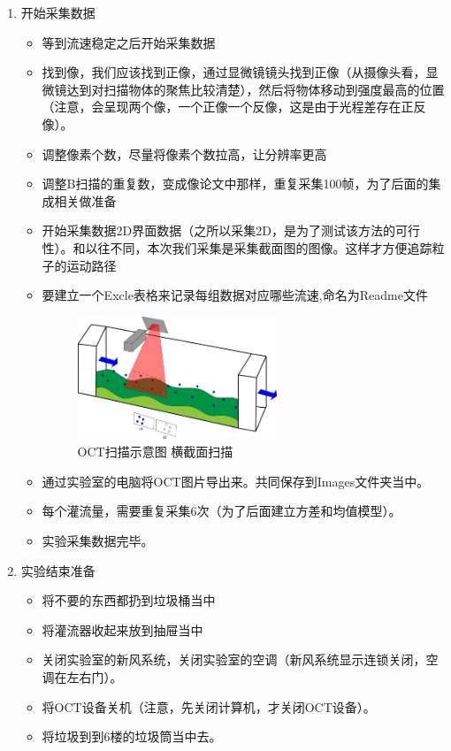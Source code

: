 \documentclass[12pt]{article}
\begin{document}
\begin{enumerate}
    \item 开始采集数据
    \begin{itemize}
        \item 等到流速稳定之后开始采集数据
        \item 找到像，我们应该找到正像，通过显微镜镜头找到正像（从摄像头看，显微镜达到对扫描物体的聚焦比较清楚），然后将物体移动到强度最高的位置（注意，会呈现两个像，一个正像一个反像，这是由于光程差存在正反像）。
        \item 调整像素个数，尽量将像素个数拉高，让分辨率更高
        \item 调整B扫描的重复数，变成像论文中那样，重复采集100帧，为了后面的集成相关做准备
        \item 开始采集数据2D界面数据（之所以采集2D，是为了测试该方法的可行性）。和以往不同，本次我们采集是采集截面图的图像。这样才方便追踪粒子的运动路径
        \item 要建立一个Excle表格来记录每组数据对应哪些流速,命名为Readme文件

        \begin{figure}[H]
            \centering
            \includegraphics[width=0.6\textwidth]{Images/OCT扫描示意图.png}
            \caption{OCT扫描示意图 横截面扫描}

        \end{figure}
        \item 通过实验室的电脑将OCT图片导出来。共同保存到Images文件夹当中。
        \item 每个灌流量，需要重复采集6次（为了后面建立方差和均值模型）。
        \item 实验采集数据完毕。
    \end{itemize}

    \item 实验结束准备
    \begin{itemize}
        \item 将不要的东西都扔到垃圾桶当中
        \item 将灌流器收起来放到抽屉当中
        \item 关闭实验室的新风系统，关闭实验室的空调（新风系统显示连锁关闭，空调在左右门）。
        \item 将OCT设备关机（注意，先关闭计算机，才关闭OCT设备）。
        \item 将垃圾到到6楼的垃圾筒当中去。
    \end{itemize}
\end{enumerate}
\end{document}
